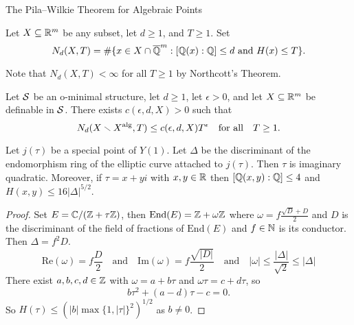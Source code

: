 \documentclass{beamer}
\begin{document}
\begin{frame}{The Pila--Wilkie Theorem for Algebraic Points}
  \begin{definition}
    Let $X\subseteq{\mathbb{R}}^m$ be any subset, let $d\ge 1$, and $T\ge 1$. Set
    \begin{equation*}
      N_d (X,T) = \#\{ x\in X\cap {\overline{\mathbb{Q}}}^m : [{\mathbb{Q}}(x):{\mathbb{Q}}]\le d
      \text{ and }
      H(x)\le T\}.
    \end{equation*}
  \end{definition}

  Note that $N_d(X,T)<\infty$ for all $T\ge 1$ by Northcott's Theorem. 

  \begin{theorem}[Pila]
    Let ${\mathcal S}$ be an o-minimal structure, let $d\ge 1$, let $\epsilon
    >0$, and   let $X\subseteq{\mathbb{R}}^m$ be
    definable in ${\mathcal S}$. 
    There exists  $c(\epsilon,d,X)>0$ such that
    \begin{equation*}
      N_d(X\smallsetminus X^{\mathrm{alg}},T)\le c(\epsilon,d,X) T^\epsilon \quad\text{for
        all}\quad T\ge 1.
    \end{equation*}
  \end{theorem}
\end{frame}

\begin{frame}
  \begin{lemma}
    Let $j(\tau)$ be a special point of $Y(1)$.
    Let $\Delta$ be the discriminant of
    the endomorphism ring of the elliptic curve attached to $j(\tau)$.
    Then $\tau$ is imaginary quadratic. Moreover, if $\tau =x+yi$ with
    $x,y\in{\mathbb{R}}$ then $[{\mathbb{Q}}(x,y):{\mathbb{Q}}]\le 4$ and $H(x,y)\le 16|\Delta|^{5/2}$.
  \end{lemma}
  \begin{proof}\renewcommand{\qedsymbol}{}
    Set $E = {\mathbb{C}}/({\mathbb{Z}}+\tau{\mathbb{Z}})$, then
    $\mathrm{End}(E) = {\mathbb{Z}} + \omega {\mathbb{Z}}$ where $\omega = f
    \frac{\sqrt{D}+D}{2}$ and $D$ is the discriminant of the field of
    fractions of $\mathrm{End}(E)$ and $f\in{\mathbb{N}}$ is its conductor.
    Then $\Delta = f^2D$.
    \begin{equation*}
      \mathrm{Re}(\omega) = f\frac{D}{2} \quad\text{and}\quad
      \mathrm{Im}(\omega) = f\frac{\sqrt{|D|}}{2}
      \quad\text{and}\quad
      |\omega| \le \frac{|\Delta|}{\sqrt{2}}\le|\Delta|
    \end{equation*}
    There exist $a,b,c,d\in{\mathbb{Z}}$ with
    $\omega=a+b\tau$ and $\omega\tau = c+d\tau$, so
    \begin{equation*}
      b\tau^2+(a-d)\tau-c=0.
    \end{equation*}
    So $H(\tau) \le (|b| \max\{1,|\tau|\}^2)^{1/2}$ as $b\not=0$.
  \end{proof}
\end{frame}
\end{document}
